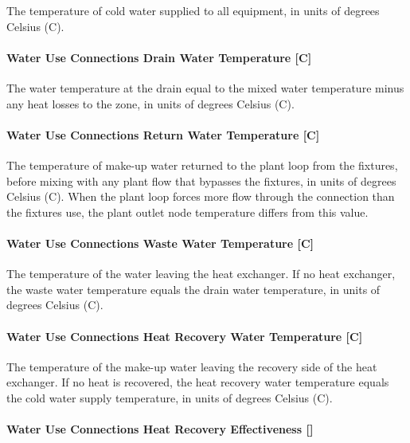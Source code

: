 The temperature of cold water supplied to all equipment, in units of degrees Celsius (C).

\paragraph{Water Use Connections Drain Water Temperature {[}C{]}}\label{water-use-connections-drain-water-temperature-c}

The water temperature at the drain equal to the mixed water temperature minus any heat losses to the zone, in units of degrees Celsius (C).

\paragraph{Water Use Connections Return Water Temperature {[}C{]}}\label{water-use-connections-return-water-temperature-c}

The temperature of make-up water returned to the plant loop from the fixtures, before mixing with any plant flow that bypasses the fixtures, in units of degrees Celsius (C). When the plant loop forces more flow through the connection than the fixtures use, the plant outlet node temperature differs from this value.

\paragraph{Water Use Connections Waste Water Temperature {[}C{]}}\label{water-use-connections-waste-water-temperature-c}

The temperature of the water leaving the heat exchanger. If no heat exchanger, the waste water temperature equals the drain water temperature, in units of degrees Celsius (C).

\paragraph{Water Use Connections Heat Recovery Water Temperature {[}C{]}}\label{water-use-connections-heat-recovery-water-temperature-c}

The temperature of the make-up water leaving the recovery side of the heat exchanger. If no heat is recovered, the heat recovery water temperature equals the cold water supply temperature, in units of degrees Celsius (C).

\paragraph{Water Use Connections Heat Recovery Effectiveness {[]}}\label{water-use-connections-heat-recovery-effectiveness}

